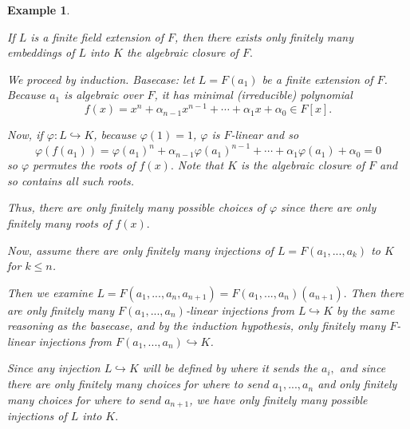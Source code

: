 \documentclass[12pt]{Qual}
\newtheorem{example}{Example}
\begin{document}
\begin{example}
$\,$

\begin{framed}
If $L$ is a finite field extension of $F$, then there exists only finitely many embeddings of $L$ into $K$ the algebraic closure of $F.$
\end{framed}
We proceed by induction. Basecase: let $L=F(a_1)$ be a finite extension of $F$. Because $a_1$ is algebraic over $F$, it has minimal (irreducible) polynomial $$f(x)=x^n+\alpha_{n-1}x^{n-1}+\cdots+\alpha_1x+\alpha_0\in F[x].$$

Now, if $\varphi:L\hookrightarrow K$, because $\varphi(1)=1$, $\varphi$ is $F$-linear and so $$\varphi(f(a_1))=\varphi(a_1)^n+\alpha_{n-1}\varphi(a_1)^{n-1}+\cdots+\alpha_1\varphi(a_1)+\alpha_0=0$$ so $\varphi$ permutes the roots of $f(x).$ Note that $K$ is the algebraic closure of $F$ and so contains all such roots.

Thus, there are only finitely many possible choices of $\varphi$ since there are only finitely many roots of $f(x).$

\vspace{0.25cm}
Now, assume there are only finitely many injections of $L=F(a_1,...,a_k)$ to $K$ for $k\le n$.
\vspace{0.15cm}

Then we examine $L=F(a_1,...,a_n,a_{n+1})=F(a_1,...,a_n)(a_{n+1}).$ Then there are only finitely many $F(a_1,...,a_n)$-linear injections from $L\hookrightarrow K$ by the same reasoning as the basecase, and by the induction hypothesis, only finitely many $F$-linear injections from $F(a_1,...,a_n)\hookrightarrow K$.

Since any injection $L\hookrightarrow K$ will be defined by where it sends the $a_i,$ and since there are only finitely many choices for where to send $a_1,...,a_n$ and only finitely many choices for where to send $a_{n+1}$, we have only finitely many possible injections of $L$ into $K.$
\end{example}
\vspace{0.5cm}
\newpage
\end{document}
